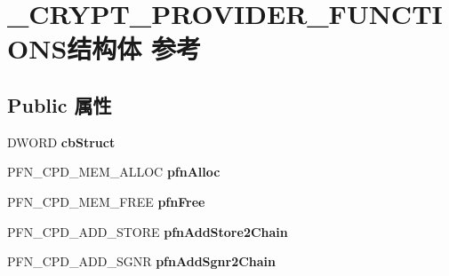 \hypertarget{struct___c_r_y_p_t___p_r_o_v_i_d_e_r___f_u_n_c_t_i_o_n_s}{}\section{\+\_\+\+C\+R\+Y\+P\+T\+\_\+\+P\+R\+O\+V\+I\+D\+E\+R\+\_\+\+F\+U\+N\+C\+T\+I\+O\+N\+S结构体 参考}
\label{struct___c_r_y_p_t___p_r_o_v_i_d_e_r___f_u_n_c_t_i_o_n_s}
\subsection*{Public 属性}
\begin{DoxyCompactItemize}
\item 
\mbox{\label{struct___c_r_y_p_t___p_r_o_v_i_d_e_r___f_u_n_c_t_i_o_n_s_a61c5f4d6037197e43b0f4adc579d0841}} 
D\+W\+O\+RD {\bfseries cb\+Struct}
\item 
\mbox{\label{struct___c_r_y_p_t___p_r_o_v_i_d_e_r___f_u_n_c_t_i_o_n_s_a2f411bbb8eb30938a3152671e65d22ee}} 
P\+F\+N\+\_\+\+C\+P\+D\+\_\+\+M\+E\+M\+\_\+\+A\+L\+L\+OC {\bfseries pfn\+Alloc}
\item 
\mbox{\label{struct___c_r_y_p_t___p_r_o_v_i_d_e_r___f_u_n_c_t_i_o_n_s_ae290ea4b7ab2a9c35cf40726ef18e4b5}} 
P\+F\+N\+\_\+\+C\+P\+D\+\_\+\+M\+E\+M\+\_\+\+F\+R\+EE {\bfseries pfn\+Free}
\item 
\mbox{\label{struct___c_r_y_p_t___p_r_o_v_i_d_e_r___f_u_n_c_t_i_o_n_s_a6df2b459876e9b02d8f0830894245fe1}} 
P\+F\+N\+\_\+\+C\+P\+D\+\_\+\+A\+D\+D\+\_\+\+S\+T\+O\+RE {\bfseries pfn\+Add\+Store2\+Chain}
\item 
\mbox{\label{struct___c_r_y_p_t___p_r_o_v_i_d_e_r___f_u_n_c_t_i_o_n_s_aeb4a28ecb1e12af658edc9119ba7080b}} 
P\+F\+N\+\_\+\+C\+P\+D\+\_\+\+A\+D\+D\+\_\+\+S\+G\+NR {\bfseries pfn\+Add\+Sgnr2\+Chain}
\item 
\mbox{\label{struct___c_r_y_p_t___p_r_o_v_i_d_e_r___f_u_n_c_t_i_o_n_s_a2a6c929ddb4d941af285ab3727728c3c}} 

\end{DoxyCompactItemize}
